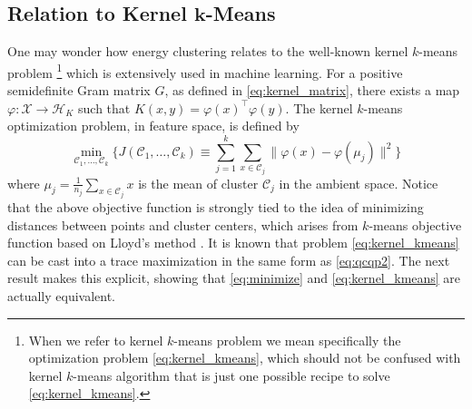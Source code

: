 \documentclass[aps,preprint,nofootinbib,floatfix]{revtex4-1}
\newcommand\kk{K}
\newcommand\HH{\mathcal{H}}
\newcommand\C{{\mathcal{C}}}
\begin{document}
\subsection*{Relation to Kernel $\bm{k}$-Means}

One may wonder how energy clustering 
relates to the well-known kernel $k$-means problem%
\footnote{When we refer to kernel $k$-means problem we mean specifically 
the optimization problem \eqref{eq:kernel_kmeans}, which should not be 
confused with kernel $k$-means algorithm that is just one possible recipe 
to solve \eqref{eq:kernel_kmeans}.} 
which is extensively used in machine learning.
For a positive semidefinite Gram matrix $G$, as defined in
\eqref{eq:kernel_matrix},
there exists a map
$\varphi: \mathcal{X} \to \HH_\kk$ such that
$\kk(x,y) = \varphi(x)^\top \varphi(y)$. The kernel $k$-means optimization
problem,
in feature space,
is defined by
\begin{equation}
\label{eq:kernel_kmeans}
\min_{\C_1,\dotsc,\C_k}\bigg\{ 
J(\C_1,\dots,\C_k) \equiv  \sum_{j=1}^k
\sum_{x \in \C_j} \| \varphi(x) - \varphi(\mu_j) \|^2
\bigg\}
\end{equation}
where $\mu_j = \tfrac{1}{n_j} \sum_{x \in \C_j} x$ is the  mean of cluster
$\C_j$ in the ambient space. Notice that the above objective function
is strongly tied to the idea of minimizing distances between points
and cluster centers, which arises from $k$-means objective function based
on Lloyd's method \cite{Lloyd}.
It is known \cite{Dhillon2,Dhillon}
that problem \eqref{eq:kernel_kmeans} 
can be cast into a trace maximization in the same form as 
\eqref{eq:qcqp2}. The next result makes this explicit, showing that
\eqref{eq:minimize} and \eqref{eq:kernel_kmeans} are actually equivalent.
\end{document}
